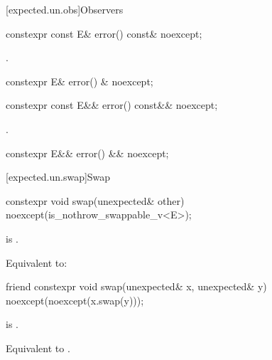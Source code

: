 [expected.un.obs]{Observers}

%
\begin{itemdecl}
constexpr const E& error() const& noexcept;
\end{itemdecl}

\begin{itemdescr}
\pnum
\returns
{}.
\end{itemdescr}

%
\begin{itemdecl}
constexpr E& error() & noexcept;
\end{itemdecl}

%
\begin{itemdecl}
constexpr const E&& error() const&& noexcept;
\end{itemdecl}

\begin{itemdescr}
\pnum
\returns
{}.
\end{itemdescr}

%
\begin{itemdecl}
constexpr E&& error() && noexcept;
\end{itemdecl}

[expected.un.swap]{Swap}

%
\begin{itemdecl}
constexpr void swap(unexpected& other) noexcept(is_nothrow_swappable_v<E>);
\end{itemdecl}

\begin{itemdescr}
\pnum
\mandates
{} is .

\pnum
\effects
Equivalent to: 
\end{itemdescr}

%
\begin{itemdecl}
friend constexpr void swap(unexpected& x, unexpected& y) noexcept(noexcept(x.swap(y)));
\end{itemdecl}

\begin{itemdescr}
\pnum
\constraints
{} is .

\pnum
\effects
Equivalent to .
\end{itemdescr}

